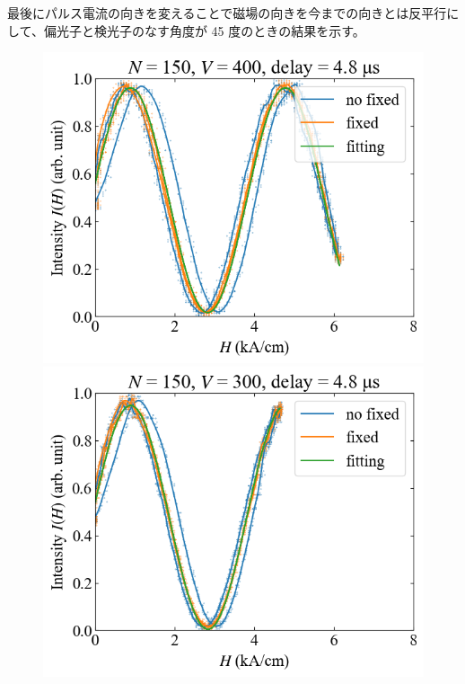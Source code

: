 \documentclass[9pt,dvipdfmx,a4paper]{jsarticle}
\begin{document}
最後にパルス電流の向きを変えることで磁場の向きを今までの向きとは反平行にして、偏光子と検光子のなす角度が 45 度のときの結果を示す。
\begin{figure}[H]
    \centering
    \begin{minipage}[t]{0.24\columnwidth}
        \centering
        \includegraphics[width = \columnwidth]{xy/22.png}
    \end{minipage}
    \hfill
    \begin{minipage}[t]{0.24\columnwidth}
        \centering
        \includegraphics[width = \columnwidth]{xy/23.png}

\end{minipage}
\end{figure}
\end{document}
